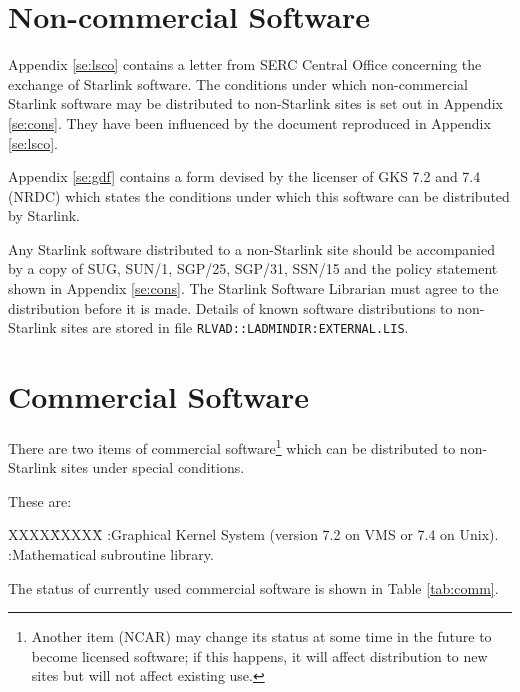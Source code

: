 \newpage

\section {Non-commercial Software}
\label{se:nonc}

Appendix \ref{se:lsco} contains a letter from SERC Central Office concerning 
the exchange of Starlink software.
The conditions under which non-commercial Starlink software may be distributed
to non-Starlink sites is set out in Appendix \ref{se:cons}.
They have been influenced by the document reproduced in Appendix
\ref{se:lsco}.

Appendix \ref{se:gdf} contains a form devised by the licenser of GKS 7.2 and
7.4 (NRDC) which states the conditions under which this software can be
distributed by Starlink.

Any Starlink software distributed to a non-Starlink site should be accompanied
by a copy of SUG, SUN/1, SGP/25, SGP/31, SSN/15 and the policy statement shown
in Appendix \ref{se:cons}. The Starlink Software Librarian must agree to the
distribution before it is made. Details of known software distributions to
non-Starlink sites are stored in file {\tt RLVAD::LADMINDIR:EXTERNAL.LIS}.

\section {Commercial Software}
\label{se:comm}

There are two items of commercial software\footnote{Another item (NCAR) may
change its status at some time in the future to become licensed software; if
this happens, it will affect distribution to new sites but will not affect
existing use.} which can be distributed to non-Starlink sites under special
conditions.

These are:
\begin{tabbing}
XXXX\=XXXXX\=\kill
{}:\>Graphical Kernel System (version 7.2 on VMS or 7.4 on Unix).\\
:\>Mathematical subroutine library.
\end{tabbing}

The status of currently used commercial software is shown in Table
\ref{tab:comm}.

